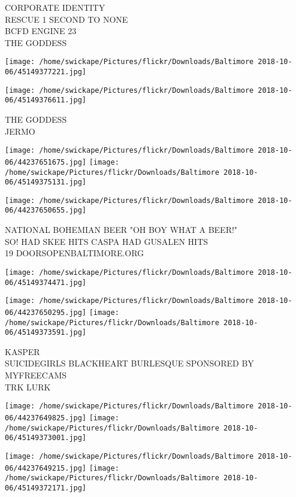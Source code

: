 \documentclass[10pt,letterpaper]{article}
\begin{document}
CORPORATE IDENTITY\\
RESCUE 1 SECOND TO NONE\\
BCFD ENGINE 23\\
THE GODDESS\\
\pagebreak

\texttt{[image: /home/swickape/Pictures/flickr/Downloads/Baltimore 2018-10-06/45149377221.jpg]}

\vspace{0.25in}
\texttt{[image: /home/swickape/Pictures/flickr/Downloads/Baltimore 2018-10-06/45149376611.jpg]}

THE GODDESS\\
JERMO\\
\pagebreak

\texttt{[image: /home/swickape/Pictures/flickr/Downloads/Baltimore 2018-10-06/44237651675.jpg]}
\texttt{[image: /home/swickape/Pictures/flickr/Downloads/Baltimore 2018-10-06/45149375131.jpg]}

\texttt{[image: /home/swickape/Pictures/flickr/Downloads/Baltimore 2018-10-06/44237650655.jpg]}

NATIONAL BOHEMIAN BEER "OH BOY WHAT A BEER!"\\
SO!  HAD SKEE HITS CASPA HAD GUSALEN HITS\\
19 DOORSOPENBALTIMORE.ORG\\
\pagebreak

\texttt{[image: /home/swickape/Pictures/flickr/Downloads/Baltimore 2018-10-06/45149374471.jpg]}

\vspace{0.25in}
\texttt{[image: /home/swickape/Pictures/flickr/Downloads/Baltimore 2018-10-06/44237650295.jpg]}
\texttt{[image: /home/swickape/Pictures/flickr/Downloads/Baltimore 2018-10-06/45149373591.jpg]}

KASPER\\
SUICIDEGIRLS BLACKHEART BURLESQUE SPONSORED BY MYFREECAMS\\
TRK LURK\\
\pagebreak

\texttt{[image: /home/swickape/Pictures/flickr/Downloads/Baltimore 2018-10-06/44237649825.jpg]}
\texttt{[image: /home/swickape/Pictures/flickr/Downloads/Baltimore 2018-10-06/45149373001.jpg]}

\texttt{[image: /home/swickape/Pictures/flickr/Downloads/Baltimore 2018-10-06/44237649215.jpg]}
\texttt{[image: /home/swickape/Pictures/flickr/Downloads/Baltimore 2018-10-06/45149372171.jpg]}
\end{document}
